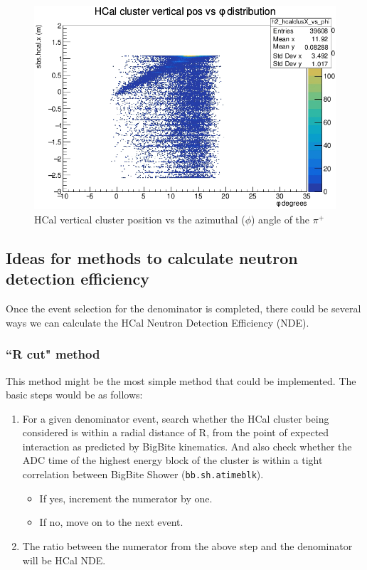 \begin{figure}[h!]
    \centering
    \includegraphics{Images/sbs9_hydrogen_analysis/HCalx_vs_piPhiang.png}
    \caption{HCal vertical cluster position vs the azimuthal ($\phi$) angle of the $\pi^+$}
    \label{fig: HCalX vs phi}
\end{figure}

\subsection{Ideas for methods to calculate neutron detection efficiency}
Once the event selection for the denominator is completed, there could be several ways we can calculate the HCal Neutron Detection Efficiency (NDE). 

\subsubsection{``R cut" method}
This method might be the most simple method that could be implemented. The basic steps would be as follows:
\begin{enumerate}
    \item For a given denominator event, search whether the HCal cluster being considered is within a radial distance of R, from the point of expected interaction as predicted by BigBite kinematics. And also check whether the ADC time of the highest energy block of the cluster is within a tight correlation between BigBite Shower (\texttt{bb.sh.atimeblk}). 
    \begin{itemize}
        \item If yes, increment the numerator by one.
        \item If no, move on to the next event.
    \end{itemize}

    \item The ratio between the numerator from the above step and the denominator will be HCal NDE.    
\end{enumerate}

